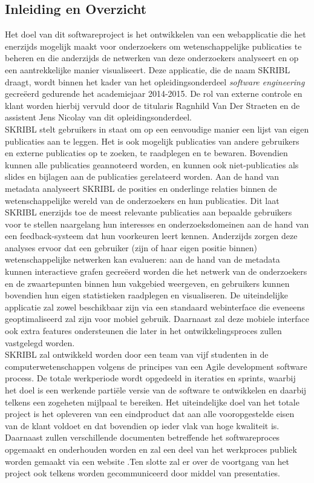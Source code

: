 \documentclass{article}
\begin{document}
\subsection{Inleiding en Overzicht}
Het doel van dit softwareproject is het ontwikkelen van een webapplicatie die het enerzijds mogelijk maakt voor onderzoekers om wetenschappelijke publicaties te beheren en die anderzijds de netwerken van deze onderzoekers analyseert en op een aantrekkelijke manier visualiseert. Deze applicatie, die de naam SKRIBL draagt, wordt binnen het kader van het opleidingsonderdeel \emph{software engineering} gecre\"{e}erd gedurende het academiejaar 2014-2015. De rol van externe controle en klant worden hierbij vervuld door de titularis Ragnhild Van Der Straeten en de assistent Jens Nicolay van dit opleidingsonderdeel.\newline
\\
SKRIBL stelt gebruikers in staat om op een eenvoudige manier een lijst van eigen publicaties aan te leggen. Het is ook mogelijk publicaties van andere gebruikers en externe publicaties op te zoeken, te raadplegen en te bewaren. Bovendien kunnen alle publicaties geannoteerd worden, en kunnen ook niet-publicaties als slides en bijlagen aan de publicaties gerelateerd worden. Aan de hand van metadata analyseert SKRIBL de posities en onderlinge relaties binnen de wetenschappelijke wereld van de onderzoekers en hun publicaties. Dit laat SKRIBL enerzijds toe de meest relevante publicaties aan bepaalde gebruikers voor te stellen naargelang hun interesses en onderzoeksdomeinen aan de hand van een feedback-systeem dat hun voorkeuren leert kennen. Anderzijds zorgen deze analyses ervoor dat een gebruiker (zijn of haar eigen positie binnen) wetenschappelijke netwerken kan evalueren: aan de hand van de metadata kunnen interactieve grafen gecre\"{e}erd worden die het netwerk van de onderzoekers en de zwaartepunten binnen hun vakgebied weergeven, en gebruikers kunnen bovendien hun eigen statistieken raadplegen en visualiseren. De uiteindelijke applicatie zal zowel beschikbaar zijn via een standaard webinterface die eveneens geoptimaliseerd zal zijn voor mobiel gebruik. Daarnaast zal deze mobiele interface ook extra features ondersteunen die later in het ontwikkelingsproces zullen vastgelegd worden.\newline
\\
SKRIBL zal ontwikkeld worden door een team van vijf studenten in de computerwetenschappen volgens de principes van een Agile development software process. De totale werkperiode wordt opgedeeld in iteraties en sprints, waarbij het doel is een werkende parti\"{e}le versie van de software te ontwikkelen en daarbij telkens een zogeheten mijlpaal te bereiken. Het uiteindelijke doel van het totale project is het opleveren van een eindproduct dat aan alle vooropgestelde eisen van de klant voldoet en dat bovendien op ieder vlak van hoge kwaliteit is. Daarnaast zullen verschillende documenten betreffende het softwareproces opgemaakt en onderhouden worden en zal een deel van het werkproces publiek worden gemaakt via een website \citep{website:skribl} .Ten slotte zal er over de voortgang van het project ook telkens worden gecommuniceerd door middel van presentaties.
\end{document}

